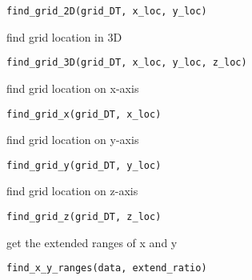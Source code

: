 \documentclass[a4paper]{book}
\begin{document}
%
\begin{Usage}
\begin{verbatim}
find_grid_2D(grid_DT, x_loc, y_loc)
\end{verbatim}
\end{Usage}
%
\begin{Description}\relax
find grid location in 3D
\end{Description}
%
\begin{Usage}
\begin{verbatim}
find_grid_3D(grid_DT, x_loc, y_loc, z_loc)
\end{verbatim}
\end{Usage}
%
\begin{Description}\relax
find grid location on x-axis
\end{Description}
%
\begin{Usage}
\begin{verbatim}
find_grid_x(grid_DT, x_loc)
\end{verbatim}
\end{Usage}
%
\begin{Description}\relax
find grid location on y-axis
\end{Description}
%
\begin{Usage}
\begin{verbatim}
find_grid_y(grid_DT, y_loc)
\end{verbatim}
\end{Usage}
%
\begin{Description}\relax
find grid location on z-axis
\end{Description}
%
\begin{Usage}
\begin{verbatim}
find_grid_z(grid_DT, z_loc)
\end{verbatim}
\end{Usage}
%
\begin{Description}\relax
get the extended ranges of x and y
\end{Description}
%
\begin{Usage}
\begin{verbatim}
find_x_y_ranges(data, extend_ratio)
\end{verbatim}
\end{Usage}
\end{document}
